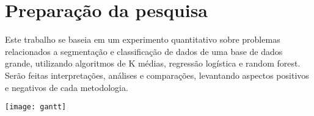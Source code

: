 
\part{Preparação da pesquisa}

Este trabalho se baseia em um experimento quantitativo sobre problemas relacionados a segmentação e classificação de dados de uma base de dados grande, utilizando algoritmos de K médias, regressão logística e random forest. Serão feitas interpretações, análises e comparações, levantando aspectos positivos e negativos de cada metodologia.

\lipsum[2-3]

\texttt{[image: gantt]}

\lipsum[2-3]

